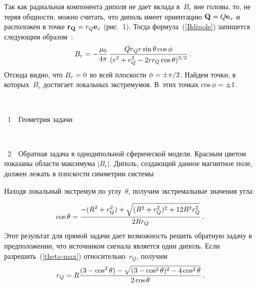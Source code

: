 \begin{multicols}{2}
Так как радиальная компонента диполя не дает вклада в~$B_r$ вне
головы, то, не теряя общности, можно считать, что диполь имеет
ориентацию $\mathbf{Q} \hm= Q \mathbf{e}_x$ и расположен в точке
$\mathbf{r_Q}\hm = r_Q \mathbf{e}_z$ (рис.~1). Тогда
формула~(\ref{Bdipole}) запишется следующим образом~\cite{hamalainen85}:
\begin{equation*}
B_r = - \displaystyle\frac{\displaystyle \mu_0\mathstrut}{\displaystyle 4 \pi\mathstrut}\,\displaystyle\frac{\displaystyle Q r_Q r \sin\theta \cos\phi\mathstrut}{\displaystyle (r^2 + r_Q^2 -2 r r_Q \cos\theta)^{3/2}\mathstrut} \,.
\end{equation*}
Отсюда видно, что $B_r \hm= 0$ во всей плоскости $\phi \hm= \pm
\pi/2$. Найдем точки, в которых~$B_r$ достигает локальных
экстремумов. В~этих точках $\cos\phi \hm= \pm 1$.\linebreak\vspace*{-12pt}

\pagebreak

\noindent
\begin{center}  %
\mbox{%
\epsfxsize=73.457mm
}
  \vspace*{5pt}

{{\figurename~1}\ \ \small{Геометрия задачи}}
  \end{center}

\vspace*{4pt}

\addtocounter{figure}{1}

\noindent
\begin{center}  %
\mbox{%
\epsfxsize=75mm %
}
\end{center}


\noindent
{{\figurename~2}\ \ \small{Обратная задача в однодипольной сферической модели. Красным цветом показаны области максимума $|B_r|$. Диполь, создающий данное магнитное поле, должен лежать в плоскости симметрии системы}}

\vspace*{16pt}

\addtocounter{figure}{1}



\noindent
 Находя локальный
экстремум по углу~$\theta$, получим экстремальные значения угла:

\noindent
\begin{equation}
\hspace*{-3mm}\cos\theta = \fr{-(R^2 + r_Q^2) + \sqrt{(R^2 + r_Q^2)^2 + 12 R^2 r_Q^2}}{2 R r_Q} \,.\!
\label{theta-max}
\end{equation}
Этот результат для прямой задачи дает возможность решить обратную
задачу в предположении, что источником сигнала является один диполь.
Если разрешить~(\ref{theta-max}) относительно~$r_Q$, получим
\begin{equation}
\hspace*{-3mm}r_Q = R \fr{(3-\cos^2 \theta) - \sqrt{(3-\cos^2 \theta)^2 - 4 \cos^2 \theta}}{2 \cos\theta}\,.\!
\label{rQ-max}
\end{equation}


\end{multicols}
